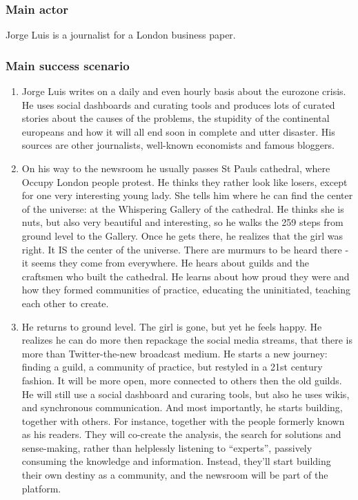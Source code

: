 \subsubsection{Main actor}

Jorge Luis is a journalist for a London business paper.

\subsubsection{Main success scenario}

\begin{enumerate}
\item
  Jorge Luis writes on a daily and even hourly basis about the eurozone
  crisis. He uses social dashboards and curating tools and produces lots
  of curated stories about the causes of the problems, the stupidity of
  the continental europeans and how it will all end soon in complete and
  utter disaster. His sources are other journalists, well-known
  economists and famous bloggers.
\item
  On his way to the newsroom he usually passes St Pauls cathedral, where
  Occupy London people protest. He thinks they rather look like losers,
  except for one very interesting young lady. She tells him where he can
  find the center of the universe: at the Whispering Gallery of the
  cathedral. He thinks she is nuts, but also very beautiful and
  interesting, so he walks the 259 steps from ground level to the
  Gallery. Once he gets there, he realizes that the girl was right. It
  IS the center of the universe. There are murmurs to be heard there -
  it seems they come from everywhere. He hears about guilds and the
  craftsmen who built the cathedral. He learns about how proud they were
  and how they formed communities of practice, educating the
  uninitiated, teaching each other to create.
\item
  He returns to ground level. The girl is gone, but yet he feels happy.
  He realizes he can do more then repackage the social media streams,
  that there is more than Twitter-the-new broadcast medium. He starts a
  new journey: finding a guild, a community of practice, but restyled in
  a 21st century fashion. It will be more open, more connected to others
  then the old guilds. He will still use a social dashboard and curaring
  tools, but also he uses wikis, and synchronous communication. And most
  importantly, he starts building, together with others. For instance,
  together with the people formerly known as his readers. They will
  co-create the analysis, the search for solutions and sense-making,
  rather than helplessly listening to ``experts'', passively consuming
  the knowledge and information. Instead, they'll start building their
  own destiny as a community, and the newsroom will be part of the
  platform.
\end{enumerate}

